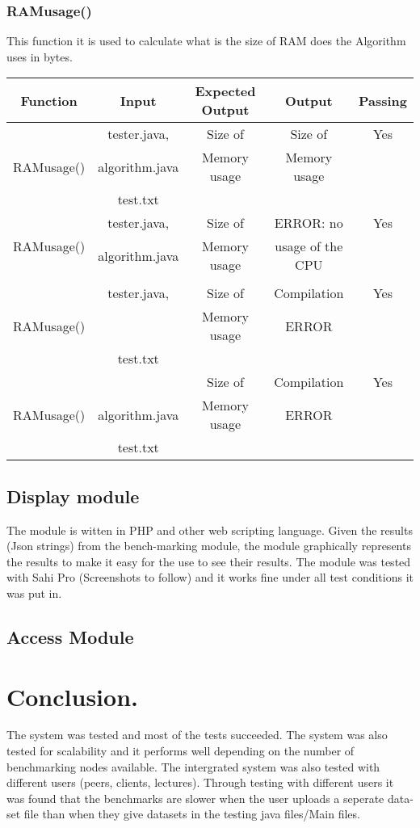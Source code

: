\documentclass[runningheads,a4paper]{article}
\begin{document}
{\subsubsection{RAMusage()}
This function it is used to calculate what is the size of RAM does the Algorithm uses in bytes.
\begin{center}
\begin{tabular}{ |c|c|c|c|c| } 
\hline
Function & Input & Expected Output & Output & Passing \\
\hline
\multirow{3}{8em}{RAMusage()} & tester.java,  & Size of & Size of &Yes\\ 
& algorithm.java & Memory usage & Memory usage &\\ 
& test.txt &  & &\\ 
\multirow{3}{8em}{RAMusage()} & tester.java,  & Size of & ERROR: no &Yes\\ 
& algorithm.java & Memory usage & usage of the CPU &\\ 
& &  & &\\
\multirow{3}{8em}{RAMusage()} & tester.java,  & Size of  &Compilation  &Yes\\ 
&  &Memory usage &ERROR& \\ 
& test.txt &  & & \\
\multirow{3}{8em}{RAMusage()} & & Size of &Compilation & Yes \\ 
& algorithm.java &Memory usage  &ERROR & \\ 
& test.txt &  & & \\
\hline
\end{tabular}
\end{center}



\subsection{Display module}
\raggedright{
The module is witten in PHP and other web scripting language. Given the results (Json strings) from the bench-marking module, the module graphically represents the results to make it easy for the use to see their results. The module was tested with Sahi Pro (Screenshots to follow) and it works fine under all test conditions it was put in.\\
}

\subsection{Access Module}

}

\section{Conclusion.}
\raggedright{
The system was tested and most of the tests succeeded. The system was also tested for scalability and it performs well depending on the number of benchmarking nodes available. The intergrated system was also tested with different users (peers, clients, lectures). Through testing with different users it was found that the benchmarks are slower when the user uploads a seperate data-set file than when they give datasets in the testing java files/Main files.
}
\end{document}
